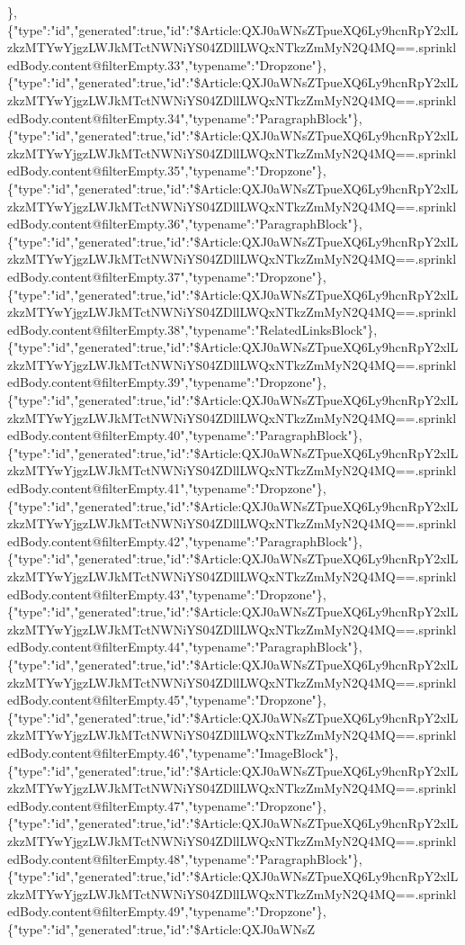 \},\{"type":"id","generated":true,"id":"\$Article:QXJ0aWNsZTpueXQ6Ly9hcnRpY2xlLzkzMTYwYjgzLWJkMTctNWNiYS04ZDllLWQxNTkzZmMyN2Q4MQ==.sprinkledBody.content@filterEmpty.33","typename":"Dropzone"\},\{"type":"id","generated":true,"id":"\$Article:QXJ0aWNsZTpueXQ6Ly9hcnRpY2xlLzkzMTYwYjgzLWJkMTctNWNiYS04ZDllLWQxNTkzZmMyN2Q4MQ==.sprinkledBody.content@filterEmpty.34","typename":"ParagraphBlock"\},\{"type":"id","generated":true,"id":"\$Article:QXJ0aWNsZTpueXQ6Ly9hcnRpY2xlLzkzMTYwYjgzLWJkMTctNWNiYS04ZDllLWQxNTkzZmMyN2Q4MQ==.sprinkledBody.content@filterEmpty.35","typename":"Dropzone"\},\{"type":"id","generated":true,"id":"\$Article:QXJ0aWNsZTpueXQ6Ly9hcnRpY2xlLzkzMTYwYjgzLWJkMTctNWNiYS04ZDllLWQxNTkzZmMyN2Q4MQ==.sprinkledBody.content@filterEmpty.36","typename":"ParagraphBlock"\},\{"type":"id","generated":true,"id":"\$Article:QXJ0aWNsZTpueXQ6Ly9hcnRpY2xlLzkzMTYwYjgzLWJkMTctNWNiYS04ZDllLWQxNTkzZmMyN2Q4MQ==.sprinkledBody.content@filterEmpty.37","typename":"Dropzone"\},\{"type":"id","generated":true,"id":"\$Article:QXJ0aWNsZTpueXQ6Ly9hcnRpY2xlLzkzMTYwYjgzLWJkMTctNWNiYS04ZDllLWQxNTkzZmMyN2Q4MQ==.sprinkledBody.content@filterEmpty.38","typename":"RelatedLinksBlock"\},\{"type":"id","generated":true,"id":"\$Article:QXJ0aWNsZTpueXQ6Ly9hcnRpY2xlLzkzMTYwYjgzLWJkMTctNWNiYS04ZDllLWQxNTkzZmMyN2Q4MQ==.sprinkledBody.content@filterEmpty.39","typename":"Dropzone"\},\{"type":"id","generated":true,"id":"\$Article:QXJ0aWNsZTpueXQ6Ly9hcnRpY2xlLzkzMTYwYjgzLWJkMTctNWNiYS04ZDllLWQxNTkzZmMyN2Q4MQ==.sprinkledBody.content@filterEmpty.40","typename":"ParagraphBlock"\},\{"type":"id","generated":true,"id":"\$Article:QXJ0aWNsZTpueXQ6Ly9hcnRpY2xlLzkzMTYwYjgzLWJkMTctNWNiYS04ZDllLWQxNTkzZmMyN2Q4MQ==.sprinkledBody.content@filterEmpty.41","typename":"Dropzone"\},\{"type":"id","generated":true,"id":"\$Article:QXJ0aWNsZTpueXQ6Ly9hcnRpY2xlLzkzMTYwYjgzLWJkMTctNWNiYS04ZDllLWQxNTkzZmMyN2Q4MQ==.sprinkledBody.content@filterEmpty.42","typename":"ParagraphBlock"\},\{"type":"id","generated":true,"id":"\$Article:QXJ0aWNsZTpueXQ6Ly9hcnRpY2xlLzkzMTYwYjgzLWJkMTctNWNiYS04ZDllLWQxNTkzZmMyN2Q4MQ==.sprinkledBody.content@filterEmpty.43","typename":"Dropzone"\},\{"type":"id","generated":true,"id":"\$Article:QXJ0aWNsZTpueXQ6Ly9hcnRpY2xlLzkzMTYwYjgzLWJkMTctNWNiYS04ZDllLWQxNTkzZmMyN2Q4MQ==.sprinkledBody.content@filterEmpty.44","typename":"ParagraphBlock"\},\{"type":"id","generated":true,"id":"\$Article:QXJ0aWNsZTpueXQ6Ly9hcnRpY2xlLzkzMTYwYjgzLWJkMTctNWNiYS04ZDllLWQxNTkzZmMyN2Q4MQ==.sprinkledBody.content@filterEmpty.45","typename":"Dropzone"\},\{"type":"id","generated":true,"id":"\$Article:QXJ0aWNsZTpueXQ6Ly9hcnRpY2xlLzkzMTYwYjgzLWJkMTctNWNiYS04ZDllLWQxNTkzZmMyN2Q4MQ==.sprinkledBody.content@filterEmpty.46","typename":"ImageBlock"\},\{"type":"id","generated":true,"id":"\$Article:QXJ0aWNsZTpueXQ6Ly9hcnRpY2xlLzkzMTYwYjgzLWJkMTctNWNiYS04ZDllLWQxNTkzZmMyN2Q4MQ==.sprinkledBody.content@filterEmpty.47","typename":"Dropzone"\},\{"type":"id","generated":true,"id":"\$Article:QXJ0aWNsZTpueXQ6Ly9hcnRpY2xlLzkzMTYwYjgzLWJkMTctNWNiYS04ZDllLWQxNTkzZmMyN2Q4MQ==.sprinkledBody.content@filterEmpty.48","typename":"ParagraphBlock"\},\{"type":"id","generated":true,"id":"\$Article:QXJ0aWNsZTpueXQ6Ly9hcnRpY2xlLzkzMTYwYjgzLWJkMTctNWNiYS04ZDllLWQxNTkzZmMyN2Q4MQ==.sprinkledBody.content@filterEmpty.49","typename":"Dropzone"\},\{"type":"id","generated":true,"id":"\$Article:QXJ0aWNsZ